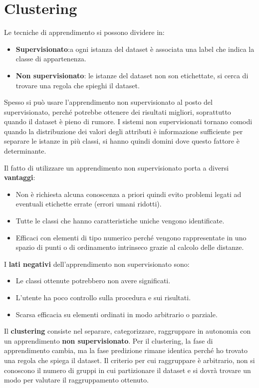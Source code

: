 \chapter{Clustering}
Le tecniche di apprendimento si possono dividere in:
\begin{itemize}
    \item \textbf{Supervisionato}:a ogni istanza del dataset è associata una
          label che indica la classe di appartenenza.
    \item \textbf{Non supervisionato}: le istanze del dataset non son etichettate,
          si cerca di trovare una regola che spieghi il dataset.
\end{itemize}
Spesso si può usare l'apprendimento non supervisionato al posto del supervisionato,
perché potrebbe ottenere dei risultati migliori, soprattutto quando il dataset è
pieno di rumore. I sistemi non supervisionati tornano comodi quando la distribuzione
dei valori degli attributi è informazione sufficiente per separare le istanze in
più classi, si hanno quindi domini dove questo fattore è determinante.

Il fatto di utilizzare un apprendimento non supervisionato porta a diversi
\textbf{vantaggi}:
\begin{itemize}
    \item Non è richiesta alcuna conoscenza a priori quindi evito problemi legati
          ad eventuali etichette errate (errori umani ridotti).
    \item Tutte le classi che hanno caratteristiche uniche vengono identificate.
    \item Efficaci con elementi di tipo numerico perché vengono rappresentate in
          uno spazio di punti o di ordinamento intrinseco grazie al calcolo delle
          distanze.
\end{itemize}
I \textbf{lati negativi} dell'apprendimento non supervisionato sono:
\begin{itemize}
    \item Le classi ottenute potrebbero non avere significati.
    \item L'utente ha poco controllo sulla procedura e sui risultati.
    \item Scarsa efficacia su elementi ordinati in modo arbitrario o parziale.
\end{itemize}
Il \textbf{clustering} consiste nel  separare, categorizzare, raggruppare in
autonomia con un apprendimento \textbf{non supervisionato}.
Per il clustering, la fase di apprendimento cambia, ma la fase predizione rimane
identica perché ho trovato una regola che spiega il dataset. Il criterio per cui
raggruppare è arbitrario, non si conoscono il numero di gruppi in cui partizionare
il dataset e si dovrà trovare un modo per valutare il raggruppamento ottenuto.

